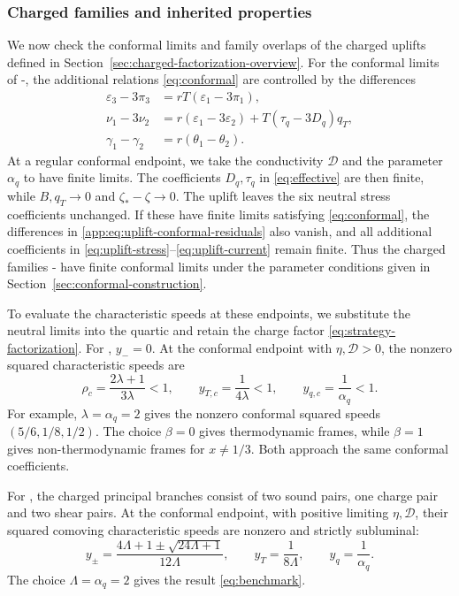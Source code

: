 \subsubsection{Charged families and inherited properties}
\label{app:sec:family-uplift-matching}
\label{app:sec:charged-explicit}\label{app:sec:charged-limits-scope}
We now check the conformal limits and family overlaps of the charged
uplifts defined in Section~\ref{sec:charged-factorization-overview}.
For the conformal limits of -, the additional
relations \eqref{eq:conformal} are controlled by the differences
\begin{align}\label{app:eq:uplift-conformal-residuals}
 \varepsilon_3-3\pi_3&=rT(\varepsilon_1-3\pi_1),\nonumber\\
 \nu_1-3\nu_2&=r(\varepsilon_1-3\varepsilon_2)+T(\tau_q-3D_q)q_T,\\
 \gamma_1-\gamma_2&=r(\theta_1-\theta_2).\nonumber
\end{align}
At a regular conformal endpoint, we take the conductivity $\mathcal D$
and the parameter $\alpha_q$ to have finite limits. The coefficients
$D_q,\tau_q$ in \eqref{eq:effective} are then finite, while
$B,q_T\to0$ and $\zeta_*-\zeta\to0$.
The uplift leaves the six neutral stress coefficients unchanged.
If these have finite limits satisfying \eqref{eq:conformal}, the
differences in \eqref{app:eq:uplift-conformal-residuals} also vanish,
and all additional coefficients in
\eqref{eq:uplift-stress}--\eqref{eq:uplift-current} remain finite.
Thus the charged families - have finite conformal
limits under the parameter conditions given in
Section~\ref{sec:conformal-construction}. 

To evaluate the characteristic speeds at these endpoints, we substitute
the neutral limits into the quartic and retain the charge factor
\eqref{eq:strategy-factorization}. For , $y_-=0$.
At the conformal endpoint with $\eta,\mathcal D>0$, the nonzero squared
characteristic speeds are
\begin{equation}\label{app:eq:charged-AS-conformal-speeds}
 \rho_c=\frac{2\lambda+1}{3\lambda}<1,\qquad
 y_{T,c}=\frac1{4\lambda}<1,\qquad y_{q,c}=\frac1{\alpha_q}<1.
\end{equation}
For example, $\lambda=\alpha_q=2$ gives the nonzero conformal squared
speeds $(5/6,1/8,1/2)$. The choice $\beta=0$ gives thermodynamic frames,
while $\beta=1$ gives non-thermodynamic frames for $x\ne1/3$.
Both approach the same conformal coefficients.

For , the charged principal branches consist of two sound
pairs, one charge pair and two shear pairs. At the conformal endpoint,
with positive limiting $\eta,\mathcal D$, their squared comoving
characteristic speeds are nonzero and strictly subluminal:
\begin{equation}
 y_\pm=\frac{4\Lambda+1\pm\sqrt{24\Lambda+1}}{12\Lambda},\qquad
 y_T=\frac1{8\Lambda},\qquad y_q=\frac1{\alpha_q}.
\end{equation}
The choice $\Lambda=\alpha_q=2$ gives the result
\eqref{eq:benchmark}.

